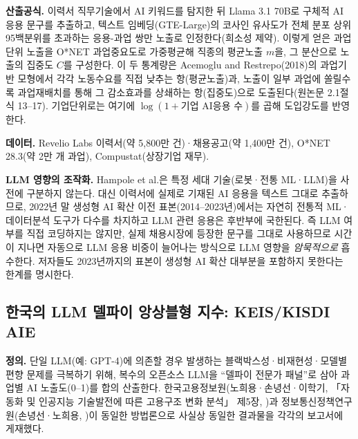 \documentclass[11pt]{article}
\begin{document}
\textbf{산출공식.} 이력서 직무기술에서 AI 키워드를 탐지한 뒤 Llama 3.1 70B로 구체적 AI 응용 문구를 추출하고, 텍스트 임베딩(GTE-Large)의 코사인 유사도가 전체 분포 상위 95백분위를 초과하는 응용-과업 쌍만 노출로 인정한다(희소성 제약). 이렇게 얻은 과업단위 노출을 O*NET 과업중요도로 가중평균해 직종의 평균노출 $m$을, 그 분산으로 노출의 집중도 $C$를 구성한다. 이 두 통계량은 Acemoglu and Restrepo(2018)의 과업기반 모형에서 각각 노동수요를 직접 낮추는 항(평균노출)과, 노출이 일부 과업에 쏠릴수록 과업재배치를 통해 그 감소효과를 상쇄하는 항(집중도)으로 도출된다(원논문 2.1절 식 13--17). 기업단위로는 여기에 $\log(1+\text{기업 AI응용 수})$를 곱해 도입강도를 반영한다.

\textbf{데이터.} Revelio Labs 이력서(약 5,800만 건)·채용공고(약 1,400만 건), O*NET 28.3(약 2만 개 과업), Compustat(상장기업 재무).

\textbf{LLM 영향의 조작화.} Hampole et al.은 특정 세대 기술(로봇·전통 ML·LLM)을 사전에 구분하지 않는다. 대신 이력서에 실제로 기재된 AI 응용을 텍스트 그대로 추출하므로, 2022년 말 생성형 AI 확산 이전 표본(2014--2023년)에서는 자연히 전통적 ML·데이터분석 도구가 다수를 차지하고 LLM 관련 응용은 후반부에 국한된다. 즉 LLM 여부를 직접 코딩하지는 않지만, 실제 채용시장에 등장한 문구를 그대로 사용하므로 시간이 지나면 자동으로 LLM 응용 비중이 늘어나는 방식으로 LLM 영향을 \emph{암묵적으로} 흡수한다. 저자들도 2023년까지의 표본이 생성형 AI 확산 대부분을 포함하지 못한다는 한계를 명시한다.

\subsection{한국의 LLM 델파이 앙상블형 지수: KEIS/KISDI AIE}
\label{sec:aie}

\textbf{정의.} 단일 LLM(예: GPT-4)에 의존할 경우 발생하는 블랙박스성·비재현성·모델별 편향 문제를 극복하기 위해, 복수의 오픈소스 LLM을 ``델파이 전문가 패널''로 삼아 과업별 AI 노출도(0--1)를 합의 산출한다. 한국고용정보원(노희용·손녕선·이학기, 「자동화 및 인공지능 기술발전에 따른 고용구조 변화 분석」 제5장, \citealp{keis-2025-ai-job-exposure-labor-demand})과 정보통신정책연구원(손녕선·노희용, \citealp{son-2025-llm-based-ai-job-exposure-measurement})이 동일한 방법론으로 사실상 동일한 결과물을 각각의 보고서에 게재했다.
\end{document}
